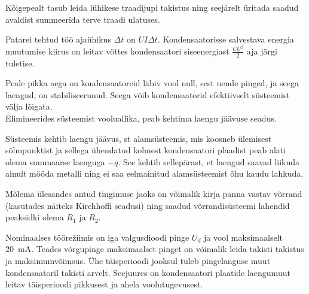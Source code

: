 \documentclass[10pt, twoside]{article}
\begin{document}
{%

\hint
Kõigepealt tasub leida lühikese traadijupi takistus ning seejärelt üritada saadud avaldist summeerida terve traadi ulatuses.
\probend
\bigskip


\hint
Patarei tehtud töö ajaühikus $\Delta t$ on $UI\Delta t$. Kondensaatorisse salvestava energia muutumise kiirus on leitav võttes kondensaatori siseenergiast $\frac{CU^2}{2}$ aja järgi tuletise.
\probend
\bigskip


\hint
\osa\osa Peale pikka aega on kondensaatoreid läbiv vool null, sest nende pinged, ja seega laengud, on stabiliseerunud. Seega võib kondensaatorid efektiivselt süsteemist välja lõigata.\\
\osa Elimineerides süsteemist vooluallika, peab kehtima laengu jäävuse seadus.
\probend
\bigskip


\hint
Süsteemis kehtib laengu jäävus, st alamsüsteemis, mis koosneb ülemisest sõlmpunktist ja sellega ühendatud kolmest kondensaatori plaadist peab alati olema summaarse laenguga $-q$. See kehtib sellepärast, et laengud saavad liikuda ainult mööda metalli ning ei saa eelmainitud alamsüsteemist õhu kaudu lahkuda.
\probend
\bigskip


\hint
Mõlema ülesandes antud tingimuse jaoks on võimalik kirja panna vastav võrrand (kasutades näiteks Kirchhoffi seadusi) ning saadud võrrandisüsteemi lahendid peaksidki olema $R_1$ ja $R_2$.
\probend
\bigskip


\hint
Nominaalses töörežiimis on iga valgusdioodi pinge $U_d$ ja vool maksimaalselt \SI{20}{mA}. Teades võrgupinge maksimaalset pinget on võimalik leida takisti takistus ja maksimumvõimsus. Ühe täisperioodi jooksul tuleb pingelanguse muut kondensaatoril takisti arvelt. Seejuures on kondensaatori plaatide laengumuut leitav täisperioodi pikkusest ja ahela voolutugevusest.
\probend
\bigskip

}
\end{document}
